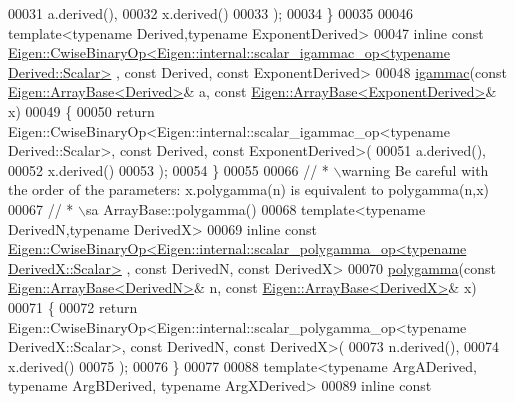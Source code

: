 \begin{DoxyCode}
00031     a.derived(),
00032     x.derived()
00033   );
00034 \}
00035 
00046 \textcolor{keyword}{template}<\textcolor{keyword}{typename} Derived,\textcolor{keyword}{typename} ExponentDerived>
00047 \textcolor{keyword}{inline} \textcolor{keyword}{const} 
      \hyperlink{group___core___module_class_eigen_1_1_cwise_binary_op}{Eigen::CwiseBinaryOp<Eigen::internal::scalar\_igammac\_op<typename Derived::Scalar>}
      , \textcolor{keyword}{const} Derived, \textcolor{keyword}{const} ExponentDerived>
00048 \hyperlink{namespace_eigen_a1abaa2ff8c7b1871eaf026a47c6bbf3b}{igammac}(\textcolor{keyword}{const} \hyperlink{group___core___module_class_eigen_1_1_array_base}{Eigen::ArrayBase<Derived>}& a, \textcolor{keyword}{const} 
      \hyperlink{group___core___module_class_eigen_1_1_array_base}{Eigen::ArrayBase<ExponentDerived>}& x)
00049 \{
00050   \textcolor{keywordflow}{return} Eigen::CwiseBinaryOp<Eigen::internal::scalar\_igammac\_op<typename Derived::Scalar>, \textcolor{keyword}{const} Derived, \textcolor{keyword}{
      const} ExponentDerived>(
00051     a.derived(),
00052     x.derived()
00053   );
00054 \}
00055 
00066 \textcolor{comment}{// * \(\backslash\)warning Be careful with the order of the parameters: x.polygamma(n) is equivalent to polygamma(n,x)}
00067 \textcolor{comment}{// * \(\backslash\)sa ArrayBase::polygamma()}
00068 \textcolor{keyword}{template}<\textcolor{keyword}{typename} DerivedN,\textcolor{keyword}{typename} DerivedX>
00069 \textcolor{keyword}{inline} \textcolor{keyword}{const} 
      \hyperlink{group___core___module_class_eigen_1_1_cwise_binary_op}{Eigen::CwiseBinaryOp<Eigen::internal::scalar\_polygamma\_op<typename DerivedX::Scalar>}
      , \textcolor{keyword}{const} DerivedN, \textcolor{keyword}{const} DerivedX>
00070 \hyperlink{namespace_eigen_ae3b47a13a0699f5dbaa0623c11333dca}{polygamma}(\textcolor{keyword}{const} \hyperlink{group___core___module_class_eigen_1_1_array_base}{Eigen::ArrayBase<DerivedN>}& n, \textcolor{keyword}{const} 
      \hyperlink{group___core___module_class_eigen_1_1_array_base}{Eigen::ArrayBase<DerivedX>}& x)
00071 \{
00072   \textcolor{keywordflow}{return} Eigen::CwiseBinaryOp<Eigen::internal::scalar\_polygamma\_op<typename DerivedX::Scalar>, \textcolor{keyword}{const} 
      DerivedN, \textcolor{keyword}{const} DerivedX>(
00073     n.derived(),
00074     x.derived()
00075   );
00076 \}
00077 
00088 \textcolor{keyword}{template}<\textcolor{keyword}{typename} ArgADerived, \textcolor{keyword}{typename} ArgBDerived, \textcolor{keyword}{typename} ArgXDerived>
00089 \textcolor{keyword}{inline} \textcolor{keyword}{const} 

\end{DoxyCode}

